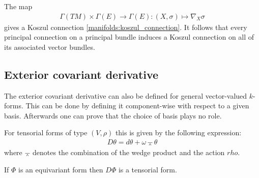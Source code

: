     \begin{property}
        The map
        \begin{gather}
            \Gamma(TM)\times\Gamma(E)\rightarrow\Gamma(E):(X, \sigma)\mapsto\nabla_X\sigma
        \end{gather}
        gives a Koszul connection \ref{manifolds:koszul_connection}. It follows that every principal connection on a principal bundle induces a Koszul connection on all of its associated vector bundles.
    \end{property}

\subsection{Exterior covariant derivative}\label{section:exterior_covariant_derivative}

    \begin{remark}
        The exterior covariant derivative can also be defined for general vector-valued $k$-forms. This can be done by defining it component-wise with respect to a given basis. Afterwards one can prove that the choice of basis plays no role.

        For tensorial forms of type $(V, \rho)$ this is given by the following expression:
        \begin{gather}
            \label{diff:prin:derivative_horizontal_form}
            D\theta = d\theta + \omega\barwedge\theta
        \end{gather}
        where $\barwedge$ denotes the combination of the wedge product and the action $rho$.
    \end{remark}

    \begin{property}
        If $\Phi$ is an equivariant form then $D\Phi$ is a tensorial form.
    \end{property}

